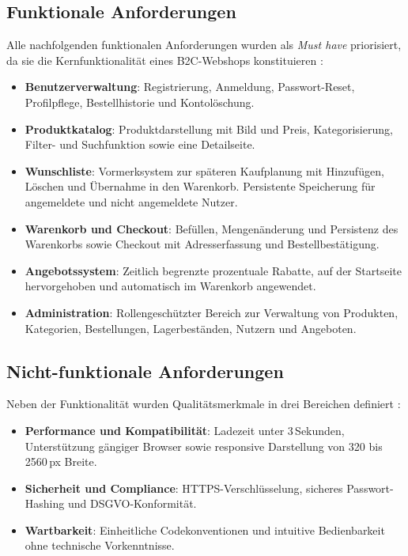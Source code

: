 \subsection{Funktionale Anforderungen}
\label{subsec:funktionale-anforderungen}

Alle nachfolgenden funktionalen Anforderungen wurden als \textit{Must have} priorisiert, da sie die Kernfunktionalität eines B2C-Webshops konstituieren \cite{heinemann2024, garcialopez2020}:

\begin{itemize}
  \item \textbf{Benutzerverwaltung}: Registrierung, Anmeldung, Passwort-Reset, Profilpflege, Bestellhistorie und Kontolöschung.
  \item \textbf{Produktkatalog}: Produktdarstellung mit Bild und Preis, Kategorisierung, Filter- und Suchfunktion sowie eine Detailseite.
  \item \textbf{Wunschliste}: Vormerksystem zur späteren Kaufplanung mit Hinzufügen, Löschen und Übernahme in den Warenkorb. Persistente Speicherung für angemeldete und nicht angemeldete Nutzer.
  \item \textbf{Warenkorb und Checkout}: Befüllen, Mengenänderung und Persistenz des Warenkorbs sowie Checkout mit Adresserfassung und Bestellbestätigung.
  \item \textbf{Angebotssystem}: Zeitlich begrenzte prozentuale Rabatte, auf der Startseite hervorgehoben und automatisch im Warenkorb angewendet.
  \item \textbf{Administration}: Rollengeschützter Bereich zur Verwaltung von Produkten, Kategorien, Bestellungen, Lagerbeständen, Nutzern und Angeboten.
\end{itemize}

\subsection{Nicht-funktionale Anforderungen}
\label{subsec:nichtfunktionale-anforderungen}

Neben der Funktionalität wurden Qualitätsmerkmale in drei Bereichen definiert \cite{garcialopez2020}:

\begin{itemize}
  \item \textbf{Performance und Kompatibilität}: Ladezeit unter 3\,Sekunden, Unterstützung gängiger Browser sowie responsive Darstellung von 320 bis 2560\,px Breite.
  \item \textbf{Sicherheit und Compliance}: HTTPS-Verschlüsselung, sicheres Passwort-Hashing und DSGVO-Konformität.
  \item \textbf{Wartbarkeit}: Einheitliche Codekonventionen und intuitive Bedienbarkeit ohne technische Vorkenntnisse.
\end{itemize}

